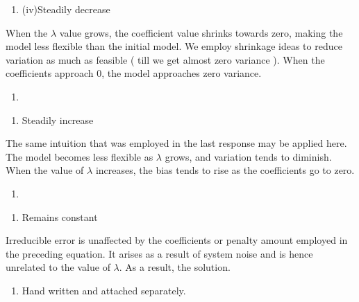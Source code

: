 \documentclass[
]{article}
\providecommand{\tightlist}{%
  \setlength{\itemsep}{0pt}\setlength{\parskip}{0pt}}
\begin{document}
\begin{enumerate}
\def\labelenumi{\alph{enumi})}
\setcounter{enumi}{2}
\tightlist
\item
  (iv)Steadily decrease
\end{enumerate}

When the \(\lambda\) value grows, the coefficient value shrinks towards
zero, making the model less flexible than the initial model. We employ
shrinkage ideas to reduce variation as much as feasible ( till we get
almost zero variance ). When the coefficients approach 0, the model
approaches zero variance.

\begin{enumerate}
\def\labelenumi{\alph{enumi})}
\setcounter{enumi}{3}
\tightlist
\item
\end{enumerate}

\begin{enumerate}
\def\labelenumi{(\roman{enumi})}
\setcounter{enumi}{2}
\tightlist
\item
  Steadily increase
\end{enumerate}

The same intuition that was employed in the last response may be applied
here. The model becomes less flexible as \(\lambda\) grows, and
variation tends to diminish. When the value of \(\lambda\) increases,
the bias tends to rise as the coefficients go to zero.

\begin{enumerate}
\def\labelenumi{\alph{enumi})}
\setcounter{enumi}{4}
\tightlist
\item
\end{enumerate}

\begin{enumerate}
\def\labelenumi{(\alph{enumi})}
\setcounter{enumi}{21}
\tightlist
\item
  Remains constant
\end{enumerate}

Irreducible error is unaffected by the coefficients or penalty amount
employed in the preceding equation. It arises as a result of system
noise and is hence unrelated to the value of \(\lambda\). As a result,
the solution.

\begin{enumerate}
\def\labelenumi{\arabic{enumi})}
\setcounter{enumi}{4}
\tightlist
\item
  Hand written and attached separately.
\end{enumerate}
\end{document}
